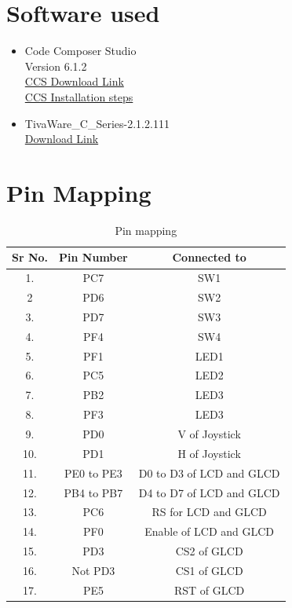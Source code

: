 \documentclass[a4paper,12pt,oneside]{book}
\begin{document}

\section{Software used}
\begin{itemize}
  \item Code Composer Studio\\  
  Version 6.1.2 \\
  \href{http://processors.wiki.ti.com/index.php/Download_CCS}{CCS Download Link}\\
  \href{http://processors.wiki.ti.com/index.php/GSG:CCSv6_installation}{CCS Installation steps}
  \item TivaWare\_C\_Series-2.1.2.111\\
  \href{http://www.ti.com/tool/sw-tm4c}{Download Link}
\end{itemize}
\newpage
\section{Pin Mapping}



\begin{table}[]
\centering
\begin{tabular}{|c|c|c|}
\hline 
Sr No. & Pin Number & Connected to \\ 
\hline 
1. & PC7 & SW1 \\ 
\hline 
2 & PD6 & SW2 \\ 
\hline 
3. & PD7 & SW3 \\ 
\hline 
4. & PF4 & SW4 \\ 
\hline 
5. & PF1 & LED1 \\ 
\hline 
6. & PC5 & LED2 \\ 
\hline 
7. & PB2 & LED3 \\ 
\hline 
8. & PF3 & LED3 \\ 
\hline 
9. & PD0 & V of Joystick \\ 
\hline 
10. & PD1 & H of Joystick \\ 
\hline 
11. & PE0 to PE3 & D0 to D3 of LCD and GLCD \\ 
\hline 
12. & PB4 to PB7 & D4 to D7 of LCD and GLCD \\ 
\hline 
13. & PC6 & RS for LCD and GLCD \\ 
\hline 
14. & PF0 & Enable of LCD and GLCD \\ 
\hline 
15. & PD3 & CS2 of GLCD \\ 
\hline 
16. & Not PD3 & CS1 of GLCD \\ 
\hline 
17. & PE5 & RST of GLCD \\ 
\hline 
\end{tabular} 
\caption{Pin mapping}
\end{table}
\end{document}
